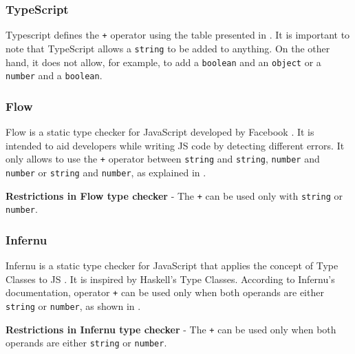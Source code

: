 \subsubsection{TypeScript}
Typescript defines the \texttt{+} operator using the table presented in . It is important to note that TypeScript allows a \texttt{string} to be added to anything. On the other hand, it does not allow, for example, to add a \texttt{boolean} and an \texttt{object} or a \texttt{number} and a \texttt{boolean}.



\subsubsection{Flow}
Flow is a static type checker for JavaScript developed by Facebook \citep{flow}. It is intended to aid developers while writing JS code by detecting different errors. It only allows to use the \texttt{+} operator between \texttt{string} and \texttt{string}, \texttt{number} and \texttt{number} or \texttt{string} and \texttt{number}, as explained in .

\begin{code}
  \captionsetup{aboveskip=0pt, belowskip=10pt}
  \caption[Restrictions in Flow type checker]{\textbf{Restrictions in Flow type checker} - The \texttt{+} can be used only with \texttt{string} or \texttt{number}.}
  \label{code:type-inference-constraints-flow}
\end{code}


\subsubsection{Infernu}
Infernu is a static type checker for JavaScript that applies the concept of Type Classes to JS \citep{infernu}. It is inspired by Haskell's Type Classes. According to Infernu's documentation, operator \texttt{+} can be used only when both operands are either \texttt{string} or \texttt{number}, as shown in .

\begin{code}
  \captionsetup{aboveskip=0pt, belowskip=10pt}
  \caption[Restrictions in Infernu type checker]{\textbf{Restrictions in Infernu type checker} - The \texttt{+} can be used only when both operands are either \texttt{string} or \texttt{number}.}
  \label{code:type-inference-constraints-infernu}
\end{code}


